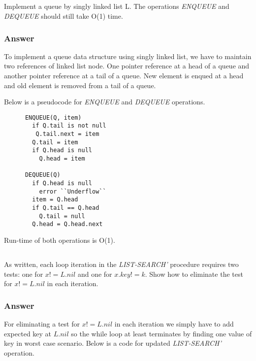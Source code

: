     \subsection{}

    Implement a queue by singly linked list L. The operations \textit{ENQUEUE}
    and \textit{DEQUEUE} should still take O(1) time.

    \subsubsection{Answer}

    To implement a queue data structure using singly linked list, we have to
    maintain two references of linked list node. One pointer reference at a
    head of a queue and another pointer reference at a tail of a queue. New
    element is enqued at a head and old element is removed from a tail of a
    queue.

    Below is a pseudocode for \textit{ENQUEUE} and \textit{DEQUEUE} operations.

    \begin{verbatim}
      ENQUEUE(Q, item)
        if Q.tail is not null
         Q.tail.next = item
        Q.tail = item
        if Q.head is null
          Q.head = item

      DEQUEUE(Q)
        if Q.head is null
          error ``Underflow``
        item = Q.head
        if Q.tail == Q.head
          Q.tail = null
        Q.head = Q.head.next
    \end{verbatim}

    Run-time of both operations is O(1).

    \subsection{}

    As written, each loop iteration in the \textit{LIST-SEARCH'} procedure
    requires two tests: one for $x != L.nil$ and one for $x.key != k$. Show how
    to eliminate the test for $x != L.nil$ in each iteration.

    \subsubsection{Answer}

    For eliminating a test for $x != L.nil$ in each iteration we simply have to
    add expected key at $L.nil$ so the while loop at least terminates by
    finding one value of key in worst case scenario. Below is a code for
    updated \textit{LIST-SEARCH'} operation.

